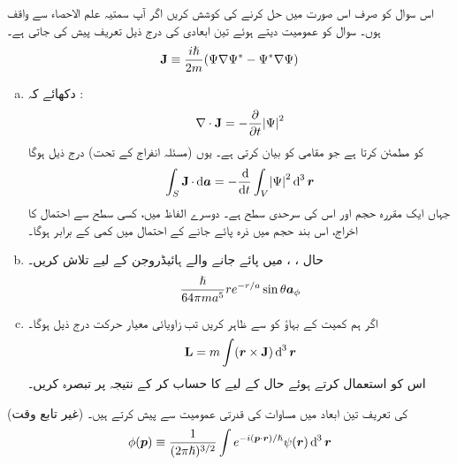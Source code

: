 اس سوال کو صرف اس صورت میں حل کرنے کی کوشش کریں اگر آپ سمتیہ علم الاحصاء سے واقف ہوں۔ سوال  کو عمومیت دیتے ہوئے تین ابعادی  کی درج ذیل تعریف پیش کی جاتی ہے۔
\begin{align}
\operatorname{\mathbf{J}} \equiv \frac{i \hslash}{2 m} (\Psi \nabla \Psi^* - \Psi^* \nabla \Psi)
\end{align}
\begin{enumerate}[a.]
\item
دکھائے کہ  : 
\begin{align}
\nabla \cdot \operatorname{\mathbf{J}} = - \frac{\partial}{\partial t} \abs{\Psi}^2
\end{align}
کو مطمئن کرتا ہے جو مقامی  کو بیان کرتی ہے۔ یوں (مسئلہ انفراج کے تحت) درج ذیل ہوگا 
\begin{align}
\int_S \mat{J} \cdot \dif \kvec{a} = - \frac{\dif}{\dif t} \int_V \abs{\Psi}^2 \dif^{\,3} \kvec{r}
\end{align}
جہاں  ایک مقررہ حجم اور  اس کی سرحدی سطح ہے۔ دوسرے الفاظ میں، کسی سطح سے احتمال کا اخراج، اس بند حجم میں ذرہ پائے جانے کے احتمال میں کمی کے برابر ہوگا۔
\item
حال ، ،  میں پائے جانے والے ہائیڈروجن کے لیے  تلاش کریں۔  
\begin{align*}
\frac{\hslash}{64 \pi m a^5} r e^{- r/a} \sin \theta {\boldsymbol{a}}_{\phi}
\end{align*}
\item
اگر ہم کمیت کے بہاؤ کو  سے ظاہر کریں تب زاویائی معیار حرکت درج ذیل ہوگا۔
\begin{align*}
\mat{L} = m \int (\kvec{r} \times \mat{J}) \dif^{\,3} \kvec{r}
\end{align*}
اس کو استعمال کرتے ہوئے حال  کے لیے  کا حساب کر کے نتیجہ پر تبصرہ کریں۔ 
\end{enumerate}
(غیر تابع وقت)  کی تعریف تین ابعاد میں مساوات  کی قدرتی عمومیت سے پیش کرتے ہیں۔ 
\begin{align}
\phi (\kvec{p}) \equiv \frac{1}{(2 \pi \hslash)^{3/2}} \int e^{- i(\kvec{p} \cdot \kvec{r})/\hslash} \psi (\kvec{r}) \dif^{\,3} \kvec{r}
\end{align}
